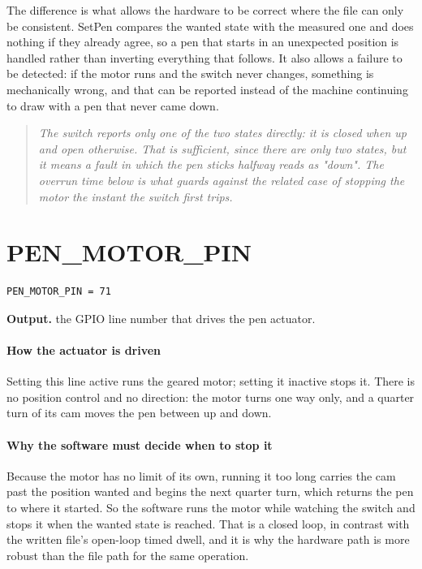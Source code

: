 The difference is what allows the hardware to be correct where the file can only be consistent. SetPen compares the wanted state with the measured one and does nothing if they already agree, so a pen that starts in an unexpected position is handled rather than inverting everything that follows. It also allows a failure to be detected: if the motor runs and the switch never changes, something is mechanically wrong, and that can be reported instead of the machine continuing to draw with a pen that never came down.


\begin{quote}\small\itshape The switch reports only one of the two states directly: it is closed when up and open otherwise. That is sufficient, since there are only two states, but it means a fault in which the pen sticks halfway reads as "down". The overrun time below is what guards against the related case of stopping the motor the instant the switch first trips.\end{quote}

\section{PEN\_MOTOR\_PIN}
\begin{lstlisting}[style=sig]
PEN_MOTOR_PIN = 71
\end{lstlisting}

\noindent\textbf{Output.} the GPIO line number that drives the pen actuator.


\paragraph{How the actuator is driven}
Setting this line active runs the geared motor; setting it inactive stops it. There is no position control and no direction: the motor turns one way only, and a quarter turn of its cam moves the pen between up and down.


\paragraph{Why the software must decide when to stop it}
Because the motor has no limit of its own, running it too long carries the cam past the position wanted and begins the next quarter turn, which returns the pen to where it started. So the software runs the motor while watching the switch and stops it when the wanted state is reached. That is a closed loop, in contrast with the written file's open-loop timed dwell, and it is why the hardware path is more robust than the file path for the same operation.


